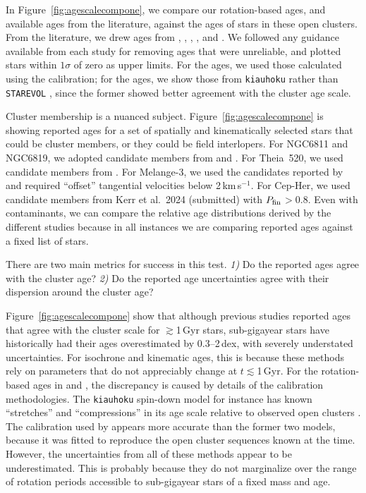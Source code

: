 \documentclass[11pt,twocolumn,tighten,linenumbers,trackchanges]{aastex63}
\newcommand{\kms}{{km\,s$^{-1}$}}
\begin{document}
In Figure~\ref{fig:agescalecompone}, we compare our rotation-based
ages, and available ages from the literature, against the ages of
stars in these open clusters. 
From the literature, we
drew ages from \citet{Reinhold_2015}, \citet{Berger_2020a_catalog},
\citet{2021AJ....161..189L}, \citet{2023ApJ...952..131M}, and
\citet{2024AJ....167..159L}.  We followed any guidance available from
each study for removing ages that were unreliable, and plotted stars
within $1\sigma$ of zero as upper limits.  For the
\citeauthor{Reinhold_2015} ages, we used those calculated using the
\citet{Mamajek_2008} calibration; for the
\citeauthor{2023ApJ...952..131M} ages, we show those from
\texttt{kiauhoku} \citep{Claytor2020} rather than \texttt{STAREVOL}
\citep{Amard2019}, since the former showed better agreement with the
cluster age scale.

Cluster membership is a nuanced subject.
Figure~\ref{fig:agescalecompone} is showing reported ages for a set of
spatially and kinematically selected stars that could be cluster
members, or they could be field interlopers.  For NGC6811 and NGC6819,
we adopted candidate members from
\citet{2018A&A...618A..93C,CantatGaudin_2020} and
\citet{Kounkel_2020}.  For Theia~520, we used candidate members from
\citet{Kounkel_2020}.  For Melange-3, we used the candidates reported
by \citet{Barber_2022} and required ``offset'' tangential velocities
below 2\,\kms.  For Cep-Her, we used candidate members from Kerr et
al.~2024 (submitted) with $P_{\rm fin}$$>$0.8.  Even with
contaminants, we can compare the relative age distributions derived by
the different studies because in all instances we are comparing
reported ages against a fixed list of stars.

There are two main metrics for success in this test. {\it 1)} Do the
reported ages agree with the cluster age? {\it 2)} Do the reported age
uncertainties agree with their dispersion around the cluster age?

Figure~\ref{fig:agescalecompone} show that although previous studies
reported ages that agree with the cluster scale for $\gtrsim$1\,Gyr
stars, sub-gigayear stars have historically had their ages
overestimated by 0.3--2\,dex, with severely understated uncertainties.
For isochrone and kinematic ages, this is because these methods rely
on parameters that do not appreciably change at $t$$\lesssim$1\,Gyr.
For the rotation-based ages in \citet{2023ApJ...952..131M} and
\citet{2024AJ....167..159L}, the discrepancy is caused by details of
the calibration methodologies.  The \texttt{kiauhoku} spin-down model
for instance has known ``stretches'' and ``compressions'' in its age
scale relative to observed open clusters \citep[see][Sec.
7.3]{2023ApJ...952..131M}.  The \citet{Mamajek_2008} calibration used
by \citet{Reinhold_2015} appears more accurate than the former two
models, because it was fitted to reproduce the open cluster sequences
known at the time.  However, the uncertainties from all of these
methods appear to be underestimated.  This is probably because they do
not marginalize over the range of rotation periods accessible to
sub-gigayear stars of a fixed mass and age.
\end{document}

